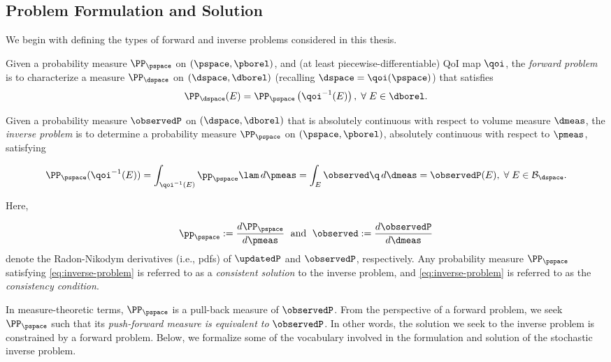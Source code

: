 \subsection{Problem Formulation and Solution}

We begin with defining the types of forward and inverse problems considered in this thesis.

\begin{defn}\label{defn:forward-problem}
  Given a probability measure $\PP_\pspace$ on $(\pspace, \pborel)$, and (at least piecewise-differentiable) QoI map $\qoi$, the \emph{forward problem} is to characterize a measure $\PP_\dspace$ on $(\dspace, \dborel)$ (recalling $\dspace = \qoi(\pspace)$) that satisfies
  \begin{equation}\label{eq:forward-problem}
    \PP_\dspace (E) = \PP_\pspace \left ( \qoi^{-1}(E) \right ), \; \forall \; E \in \dborel.
  \end{equation}
\end{defn}

\begin{defn}\label{defn:inverse-problem}
  Given a probability measure $\observedP$ on $(\dspace, \dborel)$ that is absolutely continuous with respect to volume measure $\dmeas$, the \emph{inverse problem} is to determine a probability measure $\PP_\pspace$ on $(\pspace, \pborel)$, absolutely continuous with respect to $\pmeas$, satisfying

  \begin{equation}\label{eq:inverse-problem}
    \PP_\pspace (\qoi^{-1}(E)) = \int_{\qoi^{-1}(E)} \pp_\pspace \lam \, d\pmeas = \int_E \observed \q \, d\dmeas = \observedP(E), \; \forall \; E \in \mathcal{B}_\dspace.
  \end{equation}

  \noindent Here,

  \begin{equation*}
    \pp_\pspace := \frac{d\PP_\pspace}{d\pmeas} \;\text{ and }\; \observed := \frac{d\observedP}{d\dmeas}
  \end{equation*}
  denote the Radon-Nikodym derivatives (i.e., pdfs) of $\updatedP$ and $\observedP$, respectively.
  Any probability measure $\PP_\pspace$ satisfying \eqref{eq:inverse-problem} is referred to as a \emph{consistent solution} to the inverse problem, and \eqref{eq:inverse-problem} is referred to as the \emph{consistency condition}.
\end{defn}

In measure-theoretic terms, $\PP_\pspace$ is a pull-back measure of $\observedP$.
From the perspective of a forward problem, we seek $\PP_\pspace$ such that its \emph{push-forward measure is equivalent to} $\observedP$.
In other words, the solution we seek to the inverse problem is constrained by a forward problem.
Below, we formalize some of the vocabulary involved in the formulation and solution of the stochastic inverse problem.

